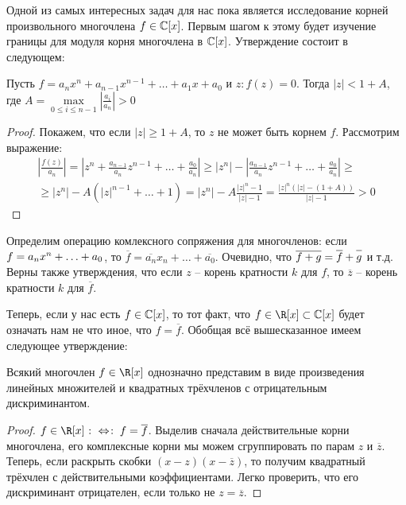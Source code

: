 Одной из самых интересных задач для нас пока является исследование корней произвольного многочлена $f\in\mathbb{C}[x]$. Первым шагом к этому будет изучение границы для модуля корня многочлена в $\mathbb{C}[x]$. Утверждение состоит в следующем:

\begin{theorem}
  Пусть $f=a_nx^n+a_{n-1}x^{n-1}+\dots+a_1x+a_0$ и $z\colon f(z)=0$. Тогда $|z|<1+A$, где $A=\max\limits_{0\le i\le n-1}\left|\frac{a_i}{a_n}\right|>0$
\end{theorem}
\begin{proof}
  Покажем, что если $|z|\ge1+A$, то $z$ не может быть корнем $f$. Рассмотрим выражение:
  \begin{multline*}  
    \left|\frac{f(z)}{a_n}\right|=\left|z^n+\frac{a_{n-1}}{a_n}z^{n-1}+\dots+\frac{a_0}{a_n}\right|\ge|z^n|-\left|\frac{a_{n-1}}{a_n}z^{n-1}+\dots+\frac{a_0}{a_n}\right|\ge\\ \ge
    |z^n|-A\left(|z|^{n-1}+\dots+1\right)=|z^n|-A\frac{|z|^n-1}{|z|-1}=\frac{|z|^n(|z|-(1+A))}{|z|-1}>0
  \end{multline*}
\end{proof}

Определим операцию комлексного сопряжения для многочленов: если $f\bw=a_nx^n\bw+\dots\bw+a_0$, то $\overline{f}=\overline{a_n}x_n+\dots+\overline{a_0}$. Очевидно, что $\overline{f+g}=\overline{\mathstrut f}+\overline{\mathstrut g}$ и т.д. Верны также утверждения, что если $z$ -- корень кратности $k$ для $f$, то $\overline{z}$ -- корень кратности $k$ для $\overline{f}$.

Теперь, если у нас есть $f\in\mathbb{C}[x]$, то тот факт, что $f\in\R[x]\subset\Cbb[x]$ будет означать нам не что иное, что $f=\overline{f}$. Обобщая всё вышесказанное имеем следующее утверждение:

\begin{theorem}
  Всякий многочлен $f\in\R[x]$ однозначно представим в виде произведения линейных множителей и квадратных трёхчленов с отрицательным дискриминантом.
\end{theorem}
\begin{proof}
  $f\in\R[x]\lra f=\overline{f}$. Выделив сначала действительные корни многочлена, его комплексные корни мы можем сгруппировать по парам $z$ и $\overline{z}$. Теперь, если раскрыть скобки $(x-z)(x-\overline{z})$, то получим квадратный трёхчлен с действительными коэффициентами. Легко проверить, что его дискриминант отрицателен, если только не $z=\overline{z}$.
\end{proof}

